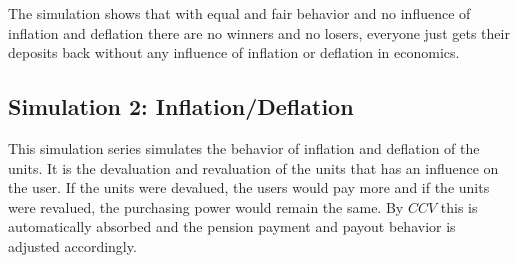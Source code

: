 \begin{table}[hbt!]
\centering
{}
\end{table}

\begin{table}[hbt!]
\centering
{}
\end{table}

The simulation shows that with equal and fair behavior and no influence of inflation and deflation there are no winners and no losers, everyone just gets their deposits back without any influence of inflation or deflation in economics.

\subsection{Simulation 2: Inflation/Deflation}

This simulation series simulates the behavior of inflation and deflation of the units. It is the devaluation and revaluation of the units that has an influence on the user. If the units were devalued, the users would pay more and if the units were revalued, the purchasing power would remain the same. By $CCV$ this is automatically absorbed and the pension payment and payout behavior is adjusted accordingly. 

